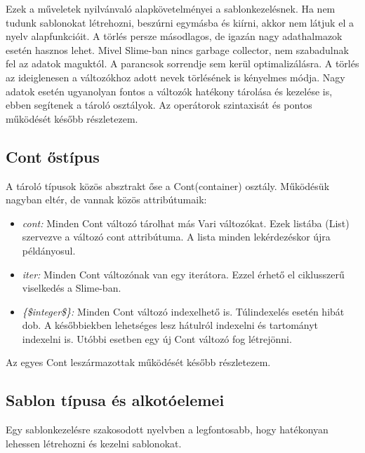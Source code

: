 Ezek a műveletek nyilvánvaló alapkövetelményei a sablonkezelésnek. 
Ha nem tudunk sablonokat létrehozni, beszúrni egymásba és kiírni, akkor nem látjuk el a nyelv alapfunkcióit.
A törlés persze másodlagos, de igazán nagy adathalmazok esetén hasznos lehet. 
Mivel Slime-ban nincs garbage collector, nem szabadulnak fel az adatok maguktól.
A parancsok sorrendje sem kerül optimalizálásra.
A törlés az ideiglenesen a változókhoz adott nevek törlésének is kényelmes módja.
Nagy adatok esetén ugyanolyan fontos a változók hatékony tárolása és kezelése is, ebben segítenek a tároló osztályok.
Az operátorok szintaxisát és pontos működését később részletezem. 


\subsection{Cont őstípus}
\label{sec:SContSuper}
A tároló típusok közös absztrakt őse a Cont(container) osztály.
Működésük nagyban eltér, de vannak közös attribútumaik:
\begin{itemize}
\item \emph{cont:} 
Minden Cont változó tárolhat más Vari változókat.
Ezek listába (List) szervezve a változó cont attribútuma.
A lista minden lekérdezéskor újra példányosul.
\item \emph{iter:} 
Minden Cont változónak van egy iterátora.
Ezzel érhető el ciklusszerű viselkedés a Slime-ban.
\item \emph{\{\$integer\$\}:} 
Minden Cont változó indexelhető is.
Túlindexelés esetén hibát dob.
A későbbiekben lehetséges lesz hátulról indexelni és tartományt indexelni is.
Utóbbi esetben egy új Cont változó fog létrejönni.
\end{itemize}

Az egyes Cont leszármazottak működését később részletezem.

\subsection{Sablon típusa és alkotóelemei}
\label{sec:STemp}
Egy sablonkezelésre szakosodott nyelvben a legfontosabb, hogy hatékonyan lehessen létrehozni és kezelni sablonokat.


